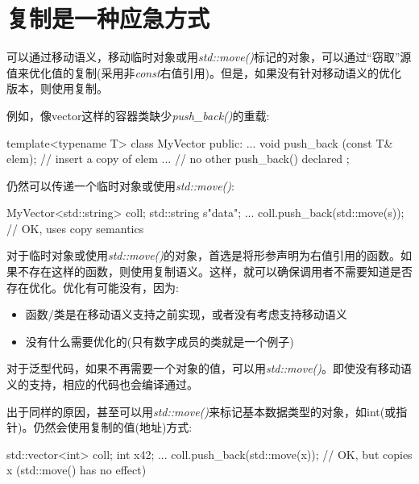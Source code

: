 \section{复制是一种应急方式}
可以通过移动语义，移动临时对象或用\textit{std::move()}标记的对象，可以通过“窃取”源值来优化值的复制(采用非\textit{const}右值引用)。但是，如果没有针对移动语义的优化版本，则使用复制。

例如，像vector这样的容器类缺少\textit{push_back()}的重载:

\begin{cppcode}
template<typename T>
class MyVector {
	public:
	...
	void push_back (const T& elem); // insert a copy of elem
	... // no other push_back() declared
};
\end{cppcode}
	
仍然可以传递一个临时对象或使用\textit{std::move()}:

\begin{cppcode}
MyVector<std::string> coll;
std::string s{"data"};
...
coll.push_back(std::move(s)); // OK, uses copy semantics
\end{cppcode}	
	
对于临时对象或使用\textit{std::move()}的对象，首选是将形参声明为右值引用的函数。如果不存在这样的函数，则使用复制语义。这样，就可以确保调用者不需要知道是否存在优化。优化有可能没有，因为:

	
\begin{itemize}
	\item 函数/类是在移动语义支持之前实现，或者没有考虑支持移动语义
	\item 没有什么需要优化的(只有数字成员的类就是一个例子)
\end{itemize}
	
对于泛型代码，如果不再需要一个对象的值，可以用\textit{std::move()}。即使没有移动语义的支持，相应的代码也会编译通过。

	
出于同样的原因，甚至可以用\textit{std::move()}来标记基本数据类型的对象，如int(或指针)。仍然会使用复制的值(地址)方式:

	
\begin{cppcode}
std::vector<int> coll;
int x{42};
...
coll.push_back(std::move(x)); // OK, but copies x (std::move() has no effect)
\end{cppcode}
	
	
	